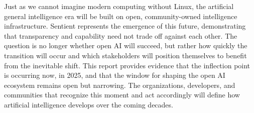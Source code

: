Just as we cannot imagine modern computing without Linux, the artificial general intelligence era will be built on open, community-owned intelligence infrastructure. Sentient represents the emergence of this future, demonstrating that transparency and capability need not trade off against each other. The question is no longer whether open AI will succeed, but rather how quickly the transition will occur and which stakeholders will position themselves to benefit from the inevitable shift. This report provides evidence that the inflection point is occurring now, in 2025, and that the window for shaping the open AI ecosystem remains open but narrowing. The organizations, developers, and communities that recognize this moment and act accordingly will define how artificial intelligence develops over the coming decades.
